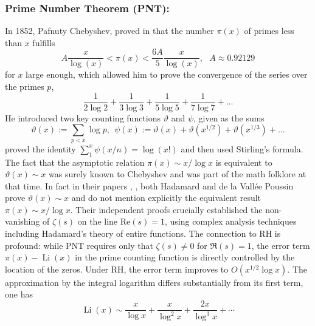 \documentclass{article}
\begin{document}
    \subsubsection{Prime Number Theorem (PNT):}\label{sectpnt} In 1852, Pafnuty  Chebyshev, proved in \cite{Chebyshev} that the number $\pi(x)$ of primes less than $x$ fulfills 
    $$A \frac{x}{\log (x)}<\pi(x)<\frac{6 A}{5} \frac{x}{\log (x)}, \ \ \  A \approx 0.92129$$ for $x$ large enough, which allowed him to prove the convergence of the series  over the  primes $p$, $$\frac{1}{2 \log 2}+\frac{1}{3 \log 3}+\frac{1}{5 \log 5}+\frac{1}{7 \log 7}+\ldots$$
    He introduced two key counting functions $\vartheta$ and $\psi$, given as the sums 
    $$
    \vartheta(x):=\sum_{p<x} \log p, \  \  \psi(x):=\vartheta(x)+\vartheta(x^{1/2})+\vartheta(x^{1/3})+\ldots
    $$
     proved the  identity 
    $
    \sum_1^x \psi(x/n)=\log(x!)$
        and then used Stirling's formula. 
     The fact that the asymptotic relation $\pi(x) \sim x / \log x$ is equivalent to $\vartheta(x) \sim x$ was surely known to Chebyshev and was part of the math folklore  at that time. In fact in their  papers \cite{Hadamard}, \cite{ValeePoussin}, both Hadamard and de la Vallée Poussin prove $\vartheta(x) \sim x$ and do not mention explicitly the equivalent result $\pi(x) \sim x / \log x$.  Their independent proofs crucially established the non-vanishing of $\zeta(s)$ on the line $\mathrm{Re}(s) = 1$, using complex analysis techniques including Hadamard's theory of entire functions. The connection to RH is profound: while PNT requires only that $\zeta(s) \neq 0$ for $\Re(s) = 1$, the error term $\pi(x)-\operatorname{Li}(x)$  in the prime counting function is directly controlled by the location of the zeros. Under RH, the error term improves to $O(x^{1/2}\log x)$. The approximation by the integral logarithm differs substantially from its first term, one has
     $$\operatorname{Li}(x) \sim \frac{x}{\log x}+\frac{x}{\log ^2 x}+\frac{2 x}{\log ^3 x}+\cdots$$
     
\end{document}
